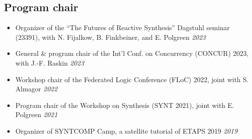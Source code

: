 \documentclass[10pt,a4paper]{moderncv}
\begin{document}
\subsection{Program chair}
\begin{itemize}
  \item Organizer of the ``The Futures of Reactive Synthesis'' Dagstuhl
    seminar (23391), with N. Fijalkow, B. Finkbeiner, and E. Polgreen \hfill
    \textit{2023}
  \item General \& program chair of the Int'l Conf. on
    Concurrency (CONCUR) 2023, with J.-F. Raskin \hfill
    \textit{2023}
  \item Workshop chair of the Federated Logic Conference (FLoC) 2022, joint
    with S. Almagor \hfill \textit{2022}
  \item Program chair of the Workshop on Synthesis (SYNT 2021), joint
    with E. Polgreen \hfill \textit{2021}
  \item Organizer of SYNTCOMP Camp, a satellite tutorial of ETAPS 2019
    \hfill \textit{2019}
\end{itemize}
\end{document}
